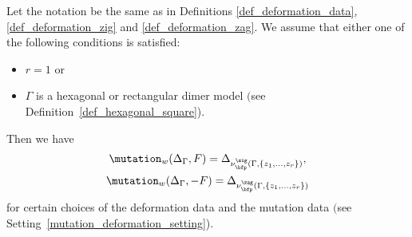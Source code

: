 \begin{Theorem}\label{mutation=deformation1}
Let the notation be the same as in Definitions {\rm \ref{def_deformation_data}}, {\rm \ref{def_deformation_zig}} and {\rm \ref{def_deformation_zag}}.
We assume that either one of the following conditions is satisfied:
\begin{itemize}\itemsep=0pt
\item[$(i)$] $r=1$ or
\item[$(ii)$] $\Gamma$ is a hexagonal or rectangular dimer model $($see Definition~{\rm \ref{def_hexagonal_square})}.
\end{itemize}
Then we have
\begin{gather*}
\mutation_{w}(\Delta_\Gamma,F)=\Delta_{\nu^\zig_\bfp(\Gamma,\{z_1,\dots,z_r\})},
\\
\mutation_{w}(\Delta_\Gamma,-F)=\Delta_{\nu^\zag_\bfp(\Gamma,\{z_1,\dots,z_r\})}
\end{gather*}
for certain choices of the deformation data and the mutation data $($see Setting~{\rm \ref{mutation_deformation_setting})}.
\end{Theorem}
